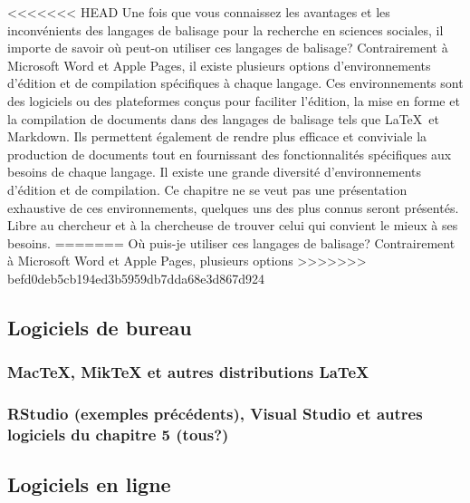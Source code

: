 \documentclass[
  letterpaper,
]{scrbook}
\begin{document}
<<<<<<< HEAD
Une fois que vous connaissez les avantages et les inconvénients des
langages de balisage pour la recherche en sciences sociales, il importe
de savoir où peut-on utiliser ces langages de balisage? Contrairement à
Microsoft Word et Apple Pages, il existe plusieurs options
d'environnements d'édition et de compilation spécifiques à chaque
langage. Ces environnements sont des logiciels ou des plateformes conçus
pour faciliter l'édition, la mise en forme et la compilation de
documents dans des langages de balisage tels que \LaTeX~et Markdown. Ils
permettent également de rendre plus efficace et conviviale la production
de documents tout en fournissant des fonctionnalités spécifiques aux
besoins de chaque langage. Il existe une grande diversité
d'environnements d'édition et de compilation. Ce chapitre ne se veut pas
une présentation exhaustive de ces environnements, quelques uns des plus
connus seront présentés. Libre au chercheur et à la chercheuse de
trouver celui qui convient le mieux à ses besoins.
=======
Où puis-je utiliser ces langages de balisage? Contrairement à Microsoft
Word et Apple Pages, plusieurs options
>>>>>>> befd0deb5cb194ed3b5959db7dda68e3d867d924

\hypertarget{logiciels-de-bureau}{%
\subsection{Logiciels de bureau}\label{logiciels-de-bureau}}

\hypertarget{mactex-miktex-et-autres-distributions}{%
\subsubsection{\texorpdfstring{MacTeX, MikTeX et autres distributions
\LaTeX}{MacTeX, MikTeX et autres distributions }}\label{mactex-miktex-et-autres-distributions}}

\hypertarget{rstudio-exemples-pruxe9cuxe9dents-visual-studio-et-autres-logiciels-du-chapitre-5-tous}{%
\subsubsection{RStudio (exemples précédents), Visual Studio et autres
logiciels du chapitre 5
(tous?)}\label{rstudio-exemples-pruxe9cuxe9dents-visual-studio-et-autres-logiciels-du-chapitre-5-tous}}

\hypertarget{logiciels-en-ligne}{%
\subsection{Logiciels en ligne}\label{logiciels-en-ligne}}
\end{document}
